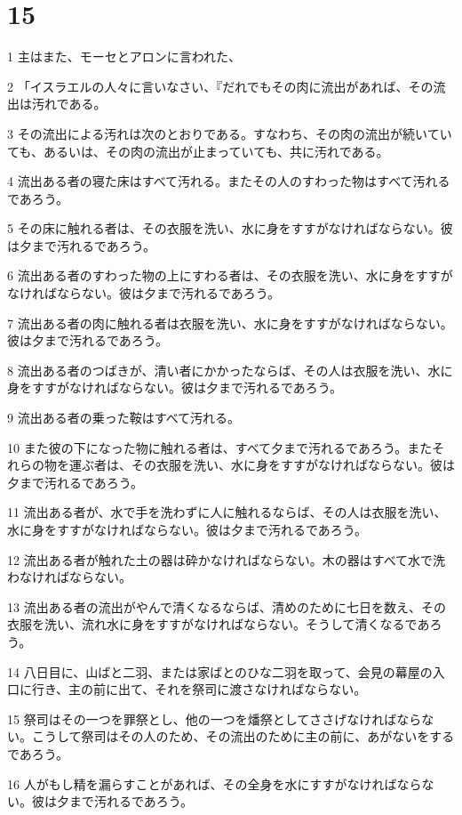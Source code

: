 \chapter{15}

\par 1 主はまた、モーセとアロンに言われた、
\par 2 「イスラエルの人々に言いなさい、『だれでもその肉に流出があれば、その流出は汚れである。
\par 3 その流出による汚れは次のとおりである。すなわち、その肉の流出が続いていても、あるいは、その肉の流出が止まっていても、共に汚れである。
\par 4 流出ある者の寝た床はすべて汚れる。またその人のすわった物はすべて汚れるであろう。
\par 5 その床に触れる者は、その衣服を洗い、水に身をすすがなければならない。彼は夕まで汚れるであろう。
\par 6 流出ある者のすわった物の上にすわる者は、その衣服を洗い、水に身をすすがなければならない。彼は夕まで汚れるであろう。
\par 7 流出ある者の肉に触れる者は衣服を洗い、水に身をすすがなければならない。彼は夕まで汚れるであろう。
\par 8 流出ある者のつばきが、清い者にかかったならば、その人は衣服を洗い、水に身をすすがなければならない。彼は夕まで汚れるであろう。
\par 9 流出ある者の乗った鞍はすべて汚れる。
\par 10 また彼の下になった物に触れる者は、すべて夕まで汚れるであろう。またそれらの物を運ぶ者は、その衣服を洗い、水に身をすすがなければならない。彼は夕まで汚れるであろう。
\par 11 流出ある者が、水で手を洗わずに人に触れるならば、その人は衣服を洗い、水に身をすすがなければならない。彼は夕まで汚れるであろう。
\par 12 流出ある者が触れた土の器は砕かなければならない。木の器はすべて水で洗わなければならない。
\par 13 流出ある者の流出がやんで清くなるならば、清めのために七日を数え、その衣服を洗い、流れ水に身をすすがなければならない。そうして清くなるであろう。
\par 14 八日目に、山ばと二羽、または家ばとのひな二羽を取って、会見の幕屋の入口に行き、主の前に出て、それを祭司に渡さなければならない。
\par 15 祭司はその一つを罪祭とし、他の一つを燔祭としてささげなければならない。こうして祭司はその人のため、その流出のために主の前に、あがないをするであろう。
\par 16 人がもし精を漏らすことがあれば、その全身を水にすすがなければならない。彼は夕まで汚れるであろう。
